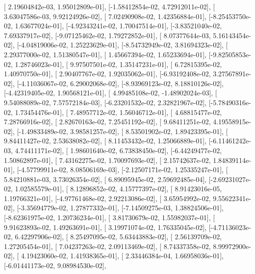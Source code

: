 \documentclass{article}
\begin{document}
       [ 2.19604842e-03,  1.95012809e-01],
       [-1.58412854e-02,  4.72912011e-02],
       [ 3.63047586e-03,  9.92124926e-02],
       [ 7.02490908e-02,  1.42356884e-01],
       [-8.25453750e-02,  1.63677024e-01],
       [-4.92343241e-02,  1.70047514e-01],
       [-3.83521040e-02,  7.69337917e-02],
       [-9.07125462e-02,  1.79272852e-01],
       [ 8.07377644e-03,  5.16143454e-02],
       [-4.04819006e-02,  1.25223629e-01],
       [-8.54732949e-02,  3.81694323e-02],
       [ 2.29377000e-02,  1.51380547e-01],
       [ 1.45667394e-02,  1.65233694e-01],
       [-9.82505853e-02,  1.28746023e-01],
       [ 9.97507501e-02,  1.35147231e-01],
       [ 6.72815395e-02,  1.40970750e-01],
       [ 2.90407767e-02,  1.92035062e-01],
       [-6.93192408e-02,  3.27567891e-02],
       [-4.11036067e-02,  6.29002068e-02],
       [-8.93969123e-02,  8.18810126e-02],
       [-4.42319405e-02,  1.90568121e-01],
       [ 4.99485108e-02, -1.48902024e-03],
       [ 9.54088089e-02,  7.57572184e-03],
       [-6.23201532e-02,  2.32821967e-02],
       [-5.78490316e-02,  1.73454476e-01],
       [ 7.48957712e-02,  1.56046712e-01],
       [ 4.68815477e-02,  7.28766916e-02],
       [ 2.82670163e-02,  7.25451192e-02],
       [ 9.68411251e-02,  4.19558915e-02],
       [-1.49833489e-02,  3.98581257e-02],
       [ 8.53501902e-02,  1.89423395e-01],
       [ 9.84411427e-02,  2.53638082e-02],
       [ 8.11453432e-02,  1.25066889e-01],
       [-6.11461242e-03,  4.74411171e-02],
       [ 1.98601640e-02,  6.73838450e-02],
       [-6.44249477e-02,  1.50862897e-01],
       [ 7.43162275e-02,  1.70097693e-02],
       [ 2.15742637e-02,  1.84839114e-01],
       [-4.57799911e-02,  8.08506169e-03],
       [-2.12507171e-02,  1.25335247e-01],
       [ 5.84210881e-03,  3.73026354e-02],
       [ 6.89095945e-02,  2.59692485e-04],
       [-2.69231027e-02,  1.02585579e-01],
       [ 8.12896852e-02,  4.15777397e-02],
       [ 8.91423016e-05,  1.19766321e-01],
       [-4.97761468e-02,  2.92213086e-02],
       [ 3.65954992e-02,  9.55622341e-02],
       [-3.35694779e-02,  1.27877332e-01],
       [-7.14509275e-03,  1.38824506e-01],
       [-8.62361975e-02,  1.20736234e-01],
       [ 3.81730679e-02,  1.55982037e-01],
       [ 9.91623893e-02,  1.49263691e-01],
       [ 3.19971074e-02,  1.76335045e-02],
       [-4.71136023e-02,  6.42297906e-02],
       [ 8.25497095e-02,  5.63443883e-02],
       [ 2.56139709e-02,  1.27205454e-01],
       [ 7.04237263e-02,  2.09113469e-02],
       [ 8.74337358e-02,  8.99972900e-02],
       [ 4.19423060e-02,  1.41938365e-01],
       [ 2.33446384e-04,  1.66958036e-01],
       [-6.01441173e-02,  9.08984530e-02],
\end{document}
